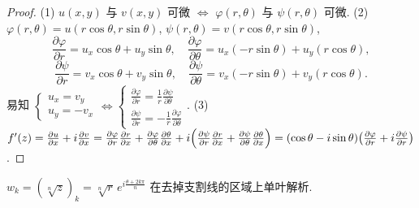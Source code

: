 \documentclass[theorem=false,mathfont=none,openany,sub3section]{easybook}
\begin{document}
\begin{proof}
  (1) $u(x,y)$ 与 $v(x,y)$ 可微 $\Leftrightarrow$ $\varphi(r,\theta)$ 与 $\psi(r,\theta)$ 可微.
  (2) $\varphi(r,\theta)=u(r\cos\theta,r\sin\theta)$, $\psi(r,\theta)=v(r\cos\theta,r\sin\theta)$,
  \[
  \frac{\partial\varphi}{\partial r}=u_{x}\cos\theta+u_{y}\sin\theta,\quad
  \frac{\partial\varphi}{\partial\theta}=u_{x}(-r\sin\theta)+u_{y}(r\cos\theta),
  \]
  \[
  \frac{\partial\psi}{\partial r}=v_{x}\cos\theta+v_{y}\sin\theta,\quad
  \frac{\partial\psi}{\partial\theta}=v_{x}(-r\sin\theta)+v_{y}(r\cos\theta).
  \]
  易知 $\left\{\begin{array}{l}u_{x}=v_{y}\\ u_{y}=-v_{x}\end{array}\right.
  \Leftrightarrow
  \left\{\begin{array}{l}\frac{\partial\varphi}{\partial r}=\frac{1}{r}\frac{\partial\psi}{\partial\theta}\\[2pt]
  \frac{\partial\psi}{\partial r}=-\frac{1}{r}\frac{\partial\varphi}{\partial\theta}\end{array}\right.$.
  (3) $f'(z)=\frac{\partial u}{\partial x}+i\frac{\partial v}{\partial x}
  =\frac{\partial\varphi}{\partial r}\frac{\partial r}{\partial x}+\frac{\partial\varphi}{\partial\theta}\frac{\partial\theta}{\partial x}
  +i\Bigl(\frac{\partial\psi}{\partial r}\frac{\partial r}{\partial x}+\frac{\partial\psi}{\partial\theta}\frac{\partial\theta}{\partial x}\Bigr)
  =(\cos\theta-i\sin\theta)\bigl(\frac{\partial\varphi}{\partial r}+i\frac{\partial\psi}{\partial r}\bigr)$.
\end{proof}

\begin{corollary}
  $w_{k}=(\sqrt[n]{z})_{k}=\sqrt[n]{r}\,e^{i\frac{\theta+2k\pi}{n}}$ 在去掉支割线的区域上单叶解析.
\end{corollary}
\end{document}
